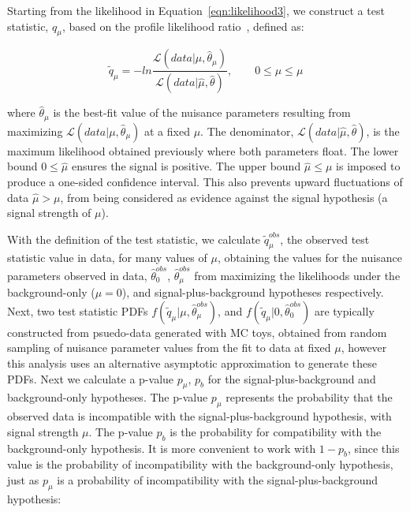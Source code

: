 Starting from the likelihood in Equation~\ref{eqn:likelihood3}, we construct a test statistic, $q_{\mu}$, based on the profile likelihood ratio~\cite{AsymptoticLimits},
defined as:

\begin{equation}
\label{eqn:test_stat}
\tilde{q}_{\mu} = -ln \frac{\mathcal{L}(data|\mu,\hat{\theta}_{\mu})}{\mathcal{L}(data|\hat{\mu},\hat{\theta})},~~~~~~~~~0 \leq \hat{\mu} \leq{\mu}
\end{equation}

\noindent where $\hat{\theta}_{\mu}$ is the best-fit value of the nuisance parameters resulting from maximizing $\mathcal{L}(data|\mu,\hat{\theta}_{\mu})$ at a fixed $\mu$. 
The denominator, $\mathcal{L}(data|\hat{\mu},\hat{\theta})$, is the maximum likelihood obtained
previously where both parameters float. The lower bound $0 \leq \hat{\mu}$ ensures the signal is positive.
The upper bound $\hat{\mu} \leq \mu$ is imposed to produce a one-sided confidence interval. This also prevents upward fluctuations of data $\hat{\mu} > \mu$, 
from being considered as evidence against the signal hypothesis (a signal strength of $\mu$).

With the definition of the test statistic, we calculate $\tilde{q}_{\mu}^{obs}$, the observed test statistic value in data,
for many values of $\mu$, obtaining the values for the nuisance parameters observed in data, $\hat{\theta}_{0}^{obs}$, $\hat{\theta}_{\mu}^{obs}$
from maximizing the likelihoods under the background-only ($\mu=0$), and signal-plus-background hypotheses respectively.
Next, two test statistic PDFs
$f(\tilde{q}_{\mu}|\mu,\hat{\theta}_{\mu}^{obs})$, and $f(\tilde{q}_{\mu}|0,\hat{\theta}_{0}^{obs})$ are typically constructed from psuedo-data
generated with MC toys, obtained from random sampling of nuisance parameter values from the fit to data at fixed $\mu$, however this analysis uses an alternative
asymptotic approximation to generate these PDFs. Next we calculate a p-value $p_{\mu}$, $p_{b}$
for the signal-plus-background and background-only hypotheses. The p-value $p_{\mu}$ represents the probability that the observed data is incompatible with the
signal-plus-background hypothesis, with signal strength $\mu$.
The p-value $p_{b}$ is the probability for compatibility with the background-only hypothesis.
It is more convenient to work with $1-p_{b}$, since this value is the probability of incompatibility with the background-only hypothesis,
just as $p_{\mu}$ is a probability of incompatibility with the signal-plus-background hypothesis:

